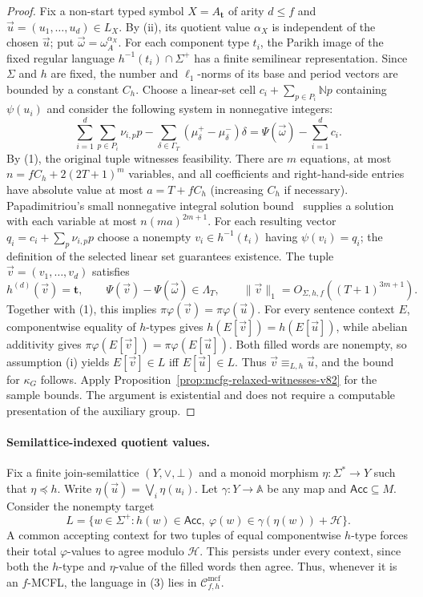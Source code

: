 \documentclass[11pt]{article}
\numberwithin{equation}{section}
\theoremstyle{plain}
\theoremstyle{definition}
\theoremstyle{remark}
\newcommand{\Cmcf}[2]{\mathcal{C}^{\mathrm{mcf}}_{#1,#2}}
\newcommand{\tuple}[1]{\vec{#1}}
\theoremstyle{plain}
\begin{document}
\begin{proof}
Fix a non-start typed symbol $X=A_{\mathbf t}$ of arity $d\le f$
and $\tuple u=(u_1,\ldots,u_d)\in L_X$.
By (ii), its quotient value $\alpha_X$ is independent of the
chosen $\tuple u$; put $\tuple\omega=\omega_A^{\alpha_X}$.
For each component type $t_i$, the Parikh image of the fixed
regular language $h^{-1}(t_i)\cap\Sigma^+$ has a finite
semilinear representation. Since $\Sigma$ and $h$ are fixed,
the number and $\ell_1$-norms of its base and period vectors
are bounded by a constant $C_h$.
Choose a linear-set cell $c_i+\sum_{p\in P_i}\mathbb Np$
containing $\psi(u_i)$ and consider the following system in
nonnegative integers:
\[
 \sum_{i=1}^d\sum_{p\in P_i}\nu_{i,p}p
 -\sum_{\delta\in\Gamma_T}
     (\mu_\delta^+-\mu_\delta^-)\delta
 =\Psi(\tuple\omega)-\sum_{i=1}^dc_i.                  \tag{2}
\]
By (1), the original tuple witnesses feasibility.
There are $m$ equations, at most
$n=fC_h+2(2T+1)^m$ variables, and all coefficients and
right-hand-side entries have absolute value at most
$a=T+fC_h$ (increasing $C_h$ if necessary).
Papadimitriou's small nonnegative integral solution
bound~\cite{Papadimitriou1981} supplies a solution with
each variable at most $n(ma)^{2m+1}$.
For each resulting vector $q_i=c_i+\sum_p\nu_{i,p}p$
choose a nonempty $v_i\in h^{-1}(t_i)$ having
$\psi(v_i)=q_i$; the definition of the selected
linear set guarantees existence.
The tuple $\tuple v=(v_1,\ldots,v_d)$ satisfies
\[
 h^{(d)}(\tuple v)=\mathbf t,\qquad
 \Psi(\tuple v)-\Psi(\tuple\omega)\in\Lambda_T,\qquad
 \|\tuple v\|_1=O_{\Sigma,h,f}((T+1)^{3m+1}).
\]
Together with (1), this implies
$\pi\varphi(\tuple v)=\pi\varphi(\tuple u)$.
For every sentence context $E$, componentwise equality
of $h$-types gives $h(E[\tuple v])=h(E[\tuple u])$,
while abelian additivity gives
$\pi\varphi(E[\tuple v])=\pi\varphi(E[\tuple u])$.
Both filled words are nonempty, so assumption (i) yields
$E[\tuple v]\in L$ iff $E[\tuple u]\in L$.
Thus $\tuple v\equiv_{L,h}\tuple u$, and the bound for
$\kappa_G$ follows. Apply
Proposition~\ref{prop:mcfg-relaxed-witnesses-v82} for the sample
bounds. The argument is existential and does not require a
computable presentation of the auxiliary group.
\end{proof}

\paragraph{Semilattice-indexed quotient values.}
Fix a finite join-semilattice $(Y,\vee,\bot)$ and a monoid
morphism $\eta:\Sigma^*\to Y$ such that $\eta\preceq h$.
Write $\eta(\tuple u)=\bigvee_i\eta(u_i)$.
Let $\gamma:Y\to\mathbb A$ be any map and
$\mathsf{Acc}\subseteq M$. Consider the nonempty target
\[
 L=\{w\in\Sigma^+:h(w)\in\mathsf{Acc},\
             \varphi(w)\in\gamma(\eta(w))+\mathcal H\}.
                                                               \tag{3}
\]
A common accepting context for two tuples of equal componentwise
$h$-type forces their total $\varphi$-values to agree modulo
$\mathcal H$. This persists under every context, since both
the $h$-type and $\eta$-value of the filled words then agree.
Thus, whenever it is an $f$-MCFL, the language in (3) lies in
$\Cmcf{f}{h}$.
\end{document}
